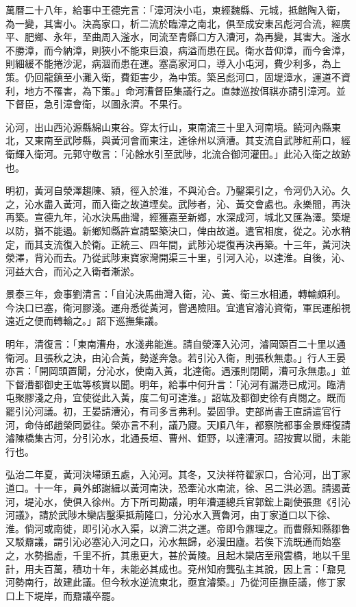 萬曆二十八年，給事中王德完言：「漳河決小屯，東經魏縣、元城，抵館陶入衛，為一變，其害小。決高家口，析二流於臨漳之南北，俱至成安東呂彪河合流，經廣平、肥鄉、永年，至曲周入滏水，同流至青縣口方入漕河，為再變，其害大。滏水不勝漳，而今納漳，則狹小不能束巨浪，病溢而患在民。衛水昔仰漳，而今舍漳，則細緩不能捲沙泥，病涸而患在運。塞高家河口，導入小屯河，費少利多，為上策。仍回龍鎮至小灘入衛，費鉅害少，為中策。築呂彪河口，固堤漳水，運道不資利，地方不罹害，為下策。」命河漕督臣集議行之。直隸巡按佴祺亦請引漳河。並下督臣，急引漳會衛，以圖永濟。不果行。

沁河，出山西沁源縣綿山東谷。穿太行山，東南流三十里入河南境。饒河內縣東北，又東南至武陟縣，與黃河會而東注，達徐州以濟漕。其支流自武陟紅荊口，經衛輝入衛河。元郭守敬言：「沁餘水引至武陟，北流合御河灌田。」此沁入衛之故跡也。

明初，黃河自滎澤趨陳、潁，徑入於淮，不與沁合。乃鑿渠引之，令河仍入沁。久之，沁水盡入黃河，而入衛之故道堙矣。武陟者，沁、黃交會處也。永樂間，再決再築。宣德九年，沁水決馬曲灣，經獲嘉至新鄉，水深成河，城北又匯為澤。築堤以防，猶不能遏。新鄉知縣許宣請堅築決口，俾由故道。遣官相度，從之。沁水稍定，而其支流復入於衛。正統三、四年間，武陟沁堤復再決再築。十三年，黃河決滎澤，背沁而去。乃從武陟東寶家灣開渠三十里，引河入沁，以達淮。自後，沁、河益大合，而沁之入衛者漸淤。

景泰三年，僉事劉清言：「自沁決馬曲灣入衛，沁、黃、衛三水相通，轉輸頗利。今決口已塞，衛河膠淺。運舟悉從黃河，嘗遇險阻。宜遣官濬沁資衛，軍民運船視遠近之便而轉輸之。」詔下巡撫集議。

明年，清復言：「東南漕舟，水淺弗能進。請自滎澤入沁河，濬岡頭百二十里以通衛河。且張秋之決，由沁合黃，勢遂奔急。若引沁入衛，則張秋無患。」行人王晏亦言：「開岡頭置閘，分沁水，使南入黃，北達衛。遇漲則閉閘，漕可永無患。」並下督漕都御史王竑等核實以聞。明年，給事中何升言：「沁河有漏港已成河。臨清屯聚膠淺之舟，宜使從此入黃，度二旬可達淮。」詔竑及都御史徐有貞閱之。既而罷引沁河議。初，王晏請漕沁，有司多言弗利。晏固爭。吏部尚書王直請遣官行河，命侍郎趙榮同晏往。榮亦言不利，議乃寢。天順八年，都察院都事金景輝復請濬陳橋集古河，分引沁水，北通長垣、曹州、鉅野，以達漕河。詔按實以聞，未能行也。

弘治二年夏，黃河決埽頭五處，入沁河。其冬，又決祥符翟家口，合沁河，出丁家道口。十一年，員外郎謝緝以黃河南決，恐牽沁水南流，徐、呂二洪必涸。請遏黃河，堤沁水，使俱入徐州。方下所司勘議，明年漕運總兵官郭鋐上副使張鼐《引沁河議》，請於武陟木欒店鑿渠抵荊隆口，分沁水入賈魯河，由丁家道口以下徐、淮。倘河或南徙，即引沁水入渠，以濟二洪之運。帝即令鼐理之。而曹縣知縣鄒魯又駁鼐議，謂引沁必塞沁入河之口，沁水無歸，必漫田廬。若俟下流既通而始塞之，水勢搗虛，千里不折，其患更大，甚於黃陵。且起木欒店至飛雲橋，地以千里計，用夫百萬，積功十年，未能必其成也。兗州知府龔弘主其說，因上言：「鼐見河勢南行，故建此議。但今秋水逆流東北，亟宜濬築。」乃從河臣撫臣議，修丁家口上下堤岸，而鼐議卒罷。

